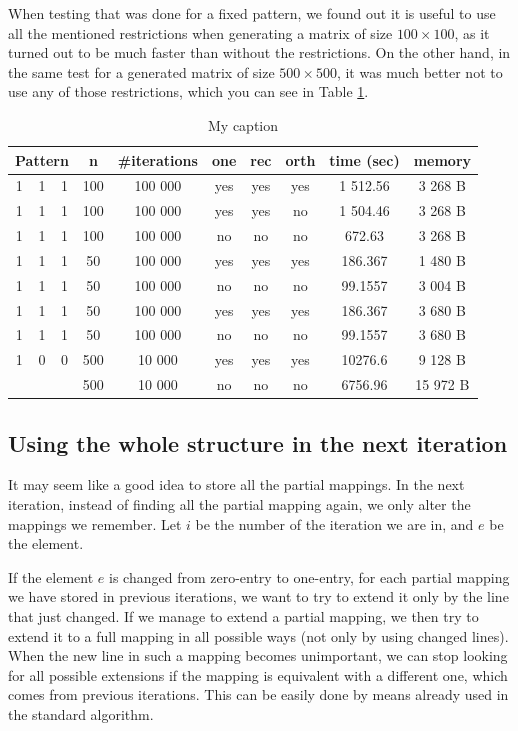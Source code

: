 When testing that was done for a fixed pattern, we found out it is useful to use all the mentioned restrictions when generating a matrix of size $100\times100$, as it turned out to be much faster than without the restrictions. On the other hand, in the same test for a generated matrix of size $500\times500$, it was much better not to use any of those restrictions, which you can see in Table \ref{approachestable}.
\begin{table}[]
\centering
\begin{tabular}{|ccc|c|c|c|c|c|c|c|}
\hline
\multicolumn{3}{|c|}{\textbf{Pattern}} & \textbf{n} & \textbf{\#iterations} & \textbf{one} & \textbf{rec} & \textbf{orth} & \textbf{time (sec)} & \textbf{memory} \\ \hline
1 & 1 & 1 & 100 & 100 000 & yes & yes & yes & 1 512.56 & 3 268 B \\ \cline{4-10} 
1 & 1 & 1 & 100 & 100 000 & yes & yes & no & 1 504.46 & 3 268 B \\ \cline{4-10} 
1 & 1 & 1 & 100 & 100 000 & no & no & no & 672.63 & 3 268 B \\ \cline{4-10} 
1 & 1 & 1 & 50 & 100 000 & yes & yes & yes & 186.367 & 1 480 B \\ \cline{4-10} 
1 & 1 & 1 & 50 & 100 000 & no & no & no & 99.1557 & 3 004 B \\ \cline{4-10} 
1 & 1 & 1 & 50 & 100 000 & yes & yes & yes & 186.367 & 3 680 B \\ \cline{4-10} 
1 & 1 & 1 & 50 & 100 000 & no & no & no & 99.1557 & 3 680 B \\ \cline{4-10} 
1 & 0 & 0 & 500 & 10 000 & yes & yes & yes & 10276.6 & 9 128 B \\ \cline{4-10} 
 &  &  & 500 & 10 000 & no & no & no & 6756.96 & 15 972 B \\ \hline
\end{tabular}
\caption{My caption}
\label{approachestable}
\end{table}

\subsection{Using the whole structure in the next iteration}
\label{wholestructure}
It may seem like a good idea to store all the partial mappings. In the next iteration, instead of finding all the partial mapping again, we only alter the mappings we remember. Let $i$ be the number of the iteration we are in, and $e$ be the element.

If the element $e$ is changed from zero-entry to one-entry, for each partial mapping we have stored in previous iterations, we want to try to extend it only by the line that just changed. If we manage to extend a partial mapping, we then try to extend it to a full mapping in all possible ways (not only by using changed lines). When the new line in such a mapping becomes unimportant, we can stop looking for all possible extensions if the mapping is equivalent with a different one, which comes from previous iterations. This can be easily done by means already used in the standard algorithm.

